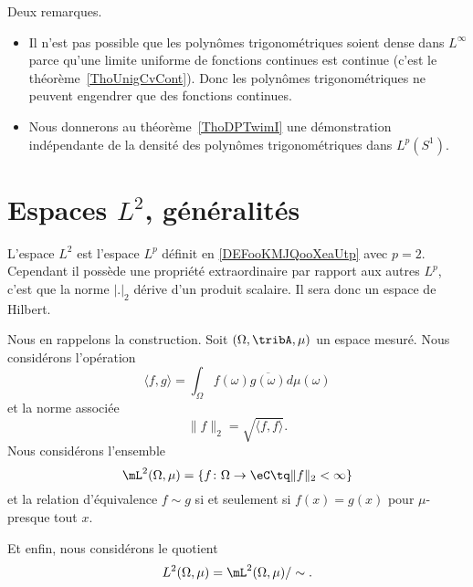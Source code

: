 \begin{remark}
	Deux remarques.
	\begin{itemize}
		\item
		      Il n'est pas possible que les polynômes trigonométriques soient dense dans \( L^{\infty}\) parce qu'une limite uniforme de fonctions continues est continue (c'est le théorème~\ref{ThoUnigCvCont}). Donc les polynômes trigonométriques ne peuvent engendrer que des fonctions continues.
		\item
		      Nous donnerons au théorème~\ref{ThoDPTwimI} une démonstration indépendante de la densité des polynômes trigonométriques dans \( L^p(S^1)\).
	\end{itemize}
\end{remark}

\section{Espaces \texorpdfstring{\( L^2\)}{\( L^2\)}, généralités}
\label{SECooEVZSooLtLhUm}

L'espace \( L^2\) est l'espace \( L^p\) définit en \ref{DEFooKMJQooXeaUtp} avec \( p=2\). Cependant il possède une propriété extraordinaire par rapport aux autres \( L^p\), c'est que la norme \( | . |_2\) dérive d'un produit scalaire. Il sera donc un espace de Hilbert.

\begin{normaltext}  \label{NORMooUEIEooYtlFse}
	Nous en rappelons la construction. Soit \( (\Omega,\tribA,\mu)\) un espace mesuré. Nous considérons l'opération
	\begin{equation}    \label{DefProdScalLubrgTj}
		\langle f, g\rangle =\int_{\Omega}f(\omega)\overline{ g(\omega)}d\mu(\omega)
	\end{equation}
	et la norme associée
	\begin{equation}
		\| f \|_2=\sqrt{\langle f, f\rangle }.
	\end{equation}
	Nous considérons l'ensemble
	\begin{equation}
		\mL^2(\Omega,\mu)=\{ f\colon \Omega\to \eC\tq \| f \|_2<\infty \}
	\end{equation}
	et la relation d'équivalence \( f\sim g\) si et seulement si \( f(x)=g(x)\) pour \( \mu\)-presque tout \( x\).

	Et enfin, nous considérons le quotient
	\begin{equation}
		L^2(\Omega,\mu)=\mL^2(\Omega,\mu)/\sim.
	\end{equation}
\end{normaltext}


